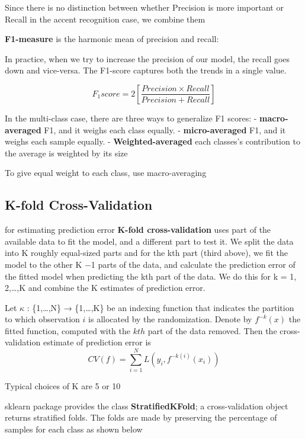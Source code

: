 \documentclass[11pt]{article}
\begin{document}
Since there is no distinction between whether Precision is more
important or Recall in the accent recognition case, we combine them

\textbf{F1-measure} is the harmonic mean of precision and recall:

In practice, when we try to increase the precision of our model, the
recall goes down and vice-versa. The F1-score captures both the trends
in a single value.

\begin{equation}
F_1score = 2 \left[ \frac {Precision \times Recall} {Precision+ Recall} \right]
\end{equation}

In the multi-class case, there are three ways to generalize F1 scores: -
\textbf{macro-averaged} F1, and it weighs each class equally. -
\textbf{micro-averaged} F1, and it weighs each sample equally. -
\textbf{Weighted-averaged} each classes's contribution to the average is
weighted by its size

To give equal weight to each class, use macro-averaging

    \hypertarget{k-fold-cross-validation}{%
\subsection{K-fold Cross-Validation}\label{k-fold-cross-validation}}

    for estimating prediction error \textbf{K-fold cross-validation} uses
part of the available data to fit the model, and a different part to
test it. We split the data into K roughly equal-sized parts and for the
kth part (third above), we fit the model to the other K −1 parts of the
data, and calculate the prediction error of the fitted model when
predicting the kth part of the data. We do this for k = 1, 2,\ldots,K
and combine the K estimates of prediction error.

Let \(κ\) : \{1,\ldots,N\} → \{1,\ldots,K\} be an indexing function that
indicates the partition to which observation \(i\) is allocated by the
randomization. Denote by \(f^{−k}(x)\) the fitted function, computed
with the \(kth\) part of the data removed. Then the cross-validation
estimate of prediction error is \begin{equation}\label{eq:}
CV(f)= \sum_{i=1}^{N} L(y_i,f^{-k(i)}(x_i))
\end{equation}

Typical choices of K are 5 or 10

sklearn package provides the class \textbf{StratifiedKFold}; a
cross-validation object returns stratified folds. The folds are made by
preserving the percentage of samples for each class as shown below
\end{document}
